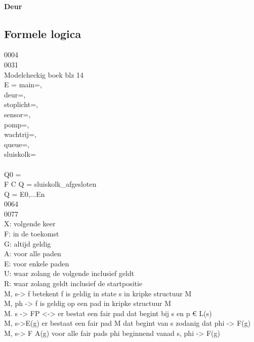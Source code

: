 \paragraph{Deur}







\subsection{Formele logica}

0004 \\
0031 \\
Modelcheckig boek blz 14 \\
E = {main={}, \\
deur={}, \\
stoplicht={}, \\
sensor={}, \\
pomp={}, \\
wachtrij={}, \\
queue={}, \\
sluiskolk={} \\
} \\
Q0 = \\
F C Q = sluiskolk_afgesloten \\
Q = E0,...En \\
0064 \\
0077 \\



X: volgende keer \\
F: in de toekomst \\
G: altijd geldig \\
A: voor alle paden \\
E: voor enkele paden \\
U: waar zolang de volgende inclusief geldt \\
R: waar zolang geldt inclusief de startpositie \\

M, s-> f betekent f is geldig in state s in kripke structuur M \\
M, ph -> f is geldig op een pad in kripke structuur M \\
M. s -> FP <-> er bestat een fair pad dat begint bij s en p € L(s) \\
M, s->E(g) er bestaat een fair pad M dat begint van s zodanig dat phi -> F(g) \\
M, s-> F A(g) voor alle fair pads phi beginnend vanad s,  phi -> F(g) \\



